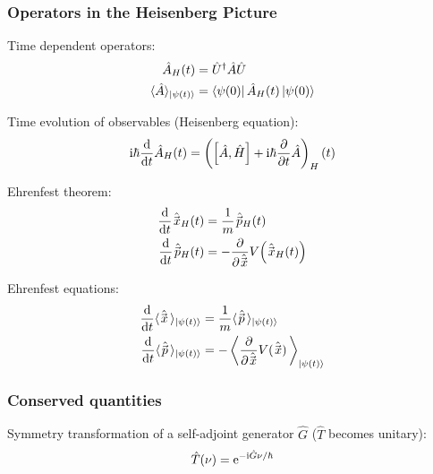 		\subsubsection{Operators in the Heisenberg Picture}
			\noindent
			Time dependent operators:
			\begin{equation}
				\begin{aligned}
					\hat{A}_H(t) &= \hat{U}^\dagger \hat{A} \hat{U} \\
					\langle \hat{A} \rangle_{\Ket{\psi(t)}} &= \Bra{\psi(0)}\hat{A}_H(t)\Ket{\psi(0)}
				\end{aligned}
			\end{equation}

			\noindent
			Time evolution of observables (Heisenberg equation):
			\begin{equation}
				\mathrm{i}\hbar \dv{t} \hat{A}_H(t) = \left(\left[\hat{A}, \hat{H}\right] + \mathrm{i}\hbar \pdv{t} \hat{A}\right)_H (t)
			\end{equation}

			\noindent
			Ehrenfest theorem:
			\begin{equation}
				\begin{aligned}
					\dv{t} \hat{\vec{x}}_H(t) &= \frac{1}{m}\hat{\vec{p}}_H(t) \\
					\dv{t} \hat{\vec{p}}_H(t) &= - \pdv{\hat{\vec{x}}} V \qty(\hat{\vec{x}}_H(t)) \\
				\end{aligned}
			\end{equation}

			\noindent
			Ehrenfest equations:
			\begin{equation}
				\begin{aligned}
					\dv{t} \langle \hat{\vec{x}} \,\rangle_{\Ket{\psi(t)}} &= \frac{1}{m} \langle \hat{\vec{p}} \,\rangle_{\Ket{\psi(t)}} \\
					\dv{t} \langle \hat{\vec{p}} \,\rangle_{\Ket{\psi(t)}} &= - \left\langle \pdv{\hat{\vec{x}}} V(\hat{\vec{x}}) \,\right\rangle_{\Ket{\psi(t)}} \\
				\end{aligned}
			\end{equation}

		\subsubsection{Conserved quantities}
			\noindent
			Symmetry transformation of a self-adjoint generator $\hat{G}$ ($\hat{T}$ becomes unitary):
			\begin{equation}
				\hat{T}(\nu) = \mathrm{e}^{-\mathrm{i}\hat{G}\nu/\hbar}
			\end{equation}

